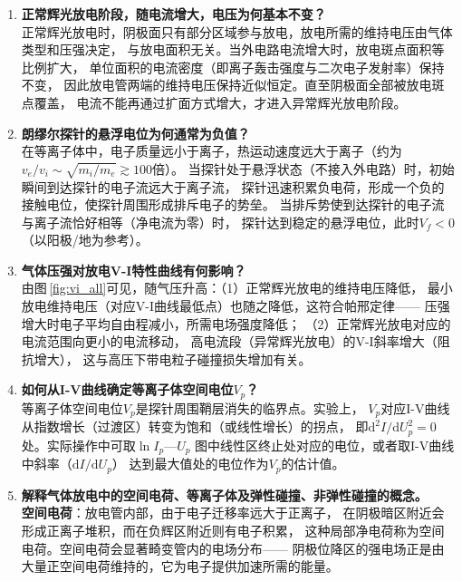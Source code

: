 \documentclass[a4paper,8pt,twocolumn]{article}
\begin{document}
\begin{enumerate}
  \item \textbf{正常辉光放电阶段，随电流增大，电压为何基本不变？}\\[0.3em]
  正常辉光放电时，阴极面只有部分区域参与放电，放电所需的维持电压由气体类型和压强决定，
  与放电面积无关。当外电路电流增大时，放电斑点面积等比例扩大，
  单位面积的电流密度（即离子轰击强度与二次电子发射率）保持不变，
  因此放电管两端的维持电压保持近似恒定。直至阴极面全部被放电斑点覆盖，
  电流不能再通过扩面方式增大，才进入异常辉光放电阶段。

  \item \textbf{朗缪尔探针的悬浮电位为何通常为负值？}\\[0.3em]
  在等离子体中，电子质量远小于离子，热运动速度远大于离子（约为$v_e/v_i\sim\sqrt{m_i/m_e}\gtrsim100$倍）。
  当探针处于悬浮状态（不接入外电路）时，初始瞬间到达探针的电子流远大于离子流，
  探针迅速积累负电荷，形成一个负的接触电位，使探针周围形成排斥电子的势垒。
  当排斥势使到达探针的电子流与离子流恰好相等（净电流为零）时，
  探针达到稳定的悬浮电位，此时$V_f<0$（以阳极/地为参考）。

  \item \textbf{气体压强对放电V-I特性曲线有何影响？}\\[0.3em]
  由图\,\ref{fig:vi_all}可见，随气压升高：（1）正常辉光放电的维持电压降低，
  最小放电维持电压（对应V-I曲线最低点）也随之降低，这符合帕邢定律——
  压强增大时电子平均自由程减小，所需电场强度降低；
  （2）正常辉光放电对应的电流范围向更小的电流移动，
  高电流段（异常辉光放电）的V-I斜率增大（阻抗增大），
  这与高压下带电粒子碰撞损失增加有关。

  \item \textbf{如何从I-V曲线确定等离子体空间电位$V_p$？}\\[0.3em]
  等离子体空间电位$V_p$是探针周围鞘层消失的临界点。实验上，
  $V_p$对应I-V曲线从指数增长（过渡区）转变为饱和（或线性增长）的拐点，
  即$\text{d}^2I/\text{d}U_p^2=0$处。实际操作中可取$\ln I_p$—$U_p$
  图中线性区终止处对应的电位，或者取I-V曲线中斜率（$\text{d}I/\text{d}U_p$）
  达到最大值处的电位作为$V_p$的估计值。

  \item \textbf{解释气体放电中的空间电荷、等离子体及弹性碰撞、非弹性碰撞的概念。}\\[0.3em]

  \textbf{空间电荷}：放电管内部，由于电子迁移率远大于正离子，
  在阴极暗区附近会形成正离子堆积，而在负辉区附近则有电子积累，
  这种局部净电荷称为空间电荷。空间电荷会显著畸变管内的电场分布——
  阴极位降区的强电场正是由大量正空间电荷维持的，它为电子提供加速所需的能量。


\end{enumerate}
\end{document}
